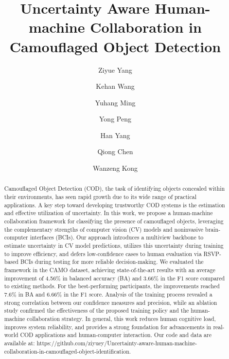 \documentclass[preprint,12pt,authoryear]{elsarticle}
\begin{document}
\begin{frontmatter}


\title{Uncertainty Aware Human-machine Collaboration in Camouflaged Object Detection} %


\author[label1]{Ziyue Yang}
\author[label1]{Kehan Wang}
\author[label1]{Yuhang Ming}
\author[label1]{Yong Peng}
\author[label1]{Han Yang}
\author[label2]{Qiong Chen}
\author[label1]{Wanzeng Kong}




\begin{abstract}
Camouflaged Object Detection (COD), the task of identifying objects concealed within their environments, has seen rapid growth due to its wide range of practical applications. A key step toward developing trustworthy COD systems is the estimation and effective utilization of uncertainty. In this work, we propose a human-machine collaboration framework for classifying the presence of camouflaged objects, leveraging the complementary strengths of computer vision (CV) models and noninvasive brain-computer interfaces (BCIs). Our approach introduces a multiview backbone to estimate uncertainty in CV model predictions, utilizes this uncertainty during training to improve efficiency, and defers low-confidence cases to human evaluation via RSVP-based BCIs during testing for more reliable decision-making. We evaluated the framework in the CAMO dataset, achieving state-of-the-art results with an average improvement of 4.56\% in balanced accuracy (BA) and 3.66\% in the F1 score compared to existing methods. For the best-performing participants, the improvements reached 7.6\% in BA and 6.66\% in the F1 score. Analysis of the training process revealed a strong correlation between our confidence measures and precision, while an ablation study confirmed the effectiveness of the proposed training policy and the human-machine collaboration strategy. In general, this work reduces human cognitive load, improves system reliability, and provides a strong foundation for advancements in real-world COD applications and human-computer interaction. Our code and data are available at: https://github.com/ziyuey/Uncertainty-aware-human-machine-collaboration-in-camouflaged-object-identification.
\end{abstract}


\end{frontmatter}
\end{document}
